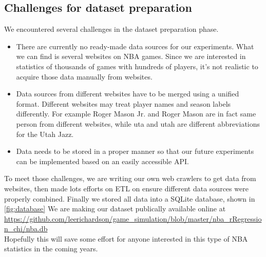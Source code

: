 \documentclass{article} %
\begin{document}
\subsection{Challenges for dataset preparation}
We encountered several challenges in the dataset preparation phase.

\begin{itemize}
\item There are currently no ready-made data sources for our experiments. What we can find is several websites on NBA games. Since we are interested in statistics of thousands of games with hundreds of players, it's not realistic to acquire those data manually from websites.
\item Data sources from different websites have to be merged using a unified format. Different websites may treat player names and season labels differently. For example Roger Mason Jr. and Roger Mason are in fact same person from different websites, while uta and utah are different abbreviations for the Utah Jazz.
\item Data needs to be stored in a proper manner so that our future experiments can be implemented based on an easily accessible API.
\end{itemize}

To meet those challenges, we are writing our own web crawlers to get data from websites, then made lots efforts on ETL on ensure different data sources were properly combined. Finally we stored all data into a SQLite database, shown in \ref{fig:database}
We are making our dataset publically available online at \\
\url{https://github.com/leerichardson/game_simulation/blob/master/nba_rRegression_chi/nba.db}\\
Hopefully this will save some effort for anyone interested in this type of NBA statistics in the coming years. \\
\end{document}
